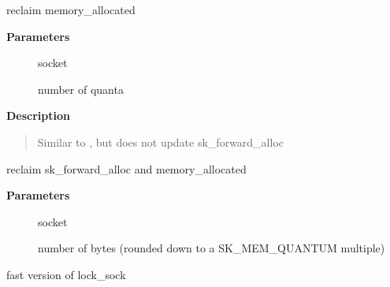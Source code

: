 \documentclass[a4paper,8pt,english]{sphinxmanual}
\begin{document}
\begin{fulllineitems}
\label{networking/kapi:c.__sk_mem_reduce_allocated}
reclaim memory\_allocated

\end{fulllineitems}


\textbf{Parameters}
\begin{description}
\item[{}] \leavevmode
socket

\item[{}] \leavevmode
number of quanta

\end{description}

\textbf{Description}
\begin{quote}

Similar to {\hyperref[networking/kapi:c.__sk_mem_reclaim]{\emph{}}}, but does not update sk\_forward\_alloc
\end{quote}

\begin{fulllineitems}
\label{networking/kapi:c.__sk_mem_reclaim}
reclaim sk\_forward\_alloc and memory\_allocated

\end{fulllineitems}


\textbf{Parameters}
\begin{description}
\item[{}] \leavevmode
socket

\item[{}] \leavevmode
number of bytes (rounded down to a SK\_MEM\_QUANTUM multiple)

\end{description}

\begin{fulllineitems}
\label{networking/kapi:c.lock_sock_fast}
fast version of lock\_sock

\end{fulllineitems}
\end{document}
